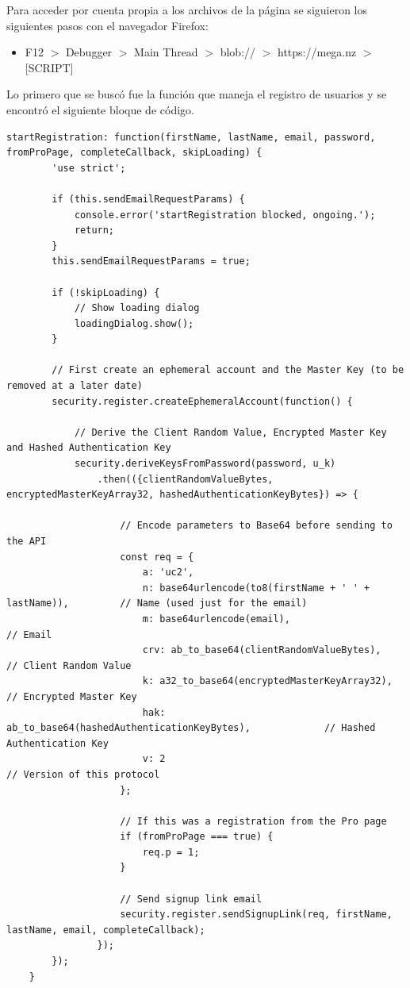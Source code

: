 \documentclass[letter,12pt]{article}
\begin{document}
Para acceder por cuenta propia a los archivos de la página se siguieron los siguientes pasos con el navegador Firefox:
\begin{itemize}
    \item F12 $>$ Debugger $>$ Main Thread $>$ blob:// $>$ https://mega.nz $>$ [SCRIPT]
\end{itemize}

Lo primero que se buscó fue la función que maneja el registro de usuarios y se encontró el siguiente bloque de código.

\begin{verbatim}
startRegistration: function(firstName, lastName, email, password, fromProPage, completeCallback, skipLoading) {
        'use strict';

        if (this.sendEmailRequestParams) {
            console.error('startRegistration blocked, ongoing.');
            return;
        }
        this.sendEmailRequestParams = true;

        if (!skipLoading) {
            // Show loading dialog
            loadingDialog.show();
        }

        // First create an ephemeral account and the Master Key (to be removed at a later date)
        security.register.createEphemeralAccount(function() {

            // Derive the Client Random Value, Encrypted Master Key and Hashed Authentication Key
            security.deriveKeysFromPassword(password, u_k)
                .then(({clientRandomValueBytes, encryptedMasterKeyArray32, hashedAuthenticationKeyBytes}) => {

                    // Encode parameters to Base64 before sending to the API
                    const req = {
                        a: 'uc2',
                        n: base64urlencode(to8(firstName + ' ' + lastName)),         // Name (used just for the email)
                        m: base64urlencode(email),                                   // Email
                        crv: ab_to_base64(clientRandomValueBytes),                   // Client Random Value
                        k: a32_to_base64(encryptedMasterKeyArray32),                 // Encrypted Master Key
                        hak: ab_to_base64(hashedAuthenticationKeyBytes),             // Hashed Authentication Key
                        v: 2                                                         // Version of this protocol
                    };

                    // If this was a registration from the Pro page
                    if (fromProPage === true) {
                        req.p = 1;
                    }

                    // Send signup link email
                    security.register.sendSignupLink(req, firstName, lastName, email, completeCallback);
                });
        });
    }
\end{verbatim}
\end{document}
